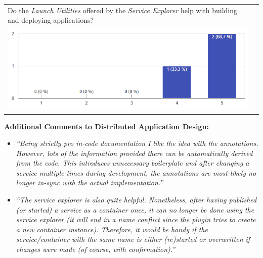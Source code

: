 \begin{center}
\begin{tabular}{ p{8.7cm} p{8.7cm} }
    	Do the \textit{Launch Utilities} offered by the \textit{Service Explorer}
    	help with building and deploying \ms{} applications? & \\
    	\includegraphics[width=\linewidth]{images/survey/app5}
    	& \\
    \end{tabular}
\end{center}

\textbf{Additional Comments to Distributed Application Design:}

\begin{itemize}
  \item \textit{``Being strictly pro in-code documentation I like the idea with
  the annotations. However, lots of the information provided there can be
  automatically derived from the code. This introduces unnecessary boilerplate
  and after changing a service multiple times during development, the
  annotations are most-likely no longer in-sync with the actual
  implementation.''}
  \item \textit{``The service explorer is also quite helpful. Nonetheless, after
  having published (or started) a service as a container once, it can no longer be
  done using the service explorer (it will end in a name conflict since the
  plugin tries to create a new container instance). Therefore, it would be handy
  if the service/container with the same name is either (re)started or
  overwritten if changes were made (of course, with confirmation).''}
\end{itemize}


